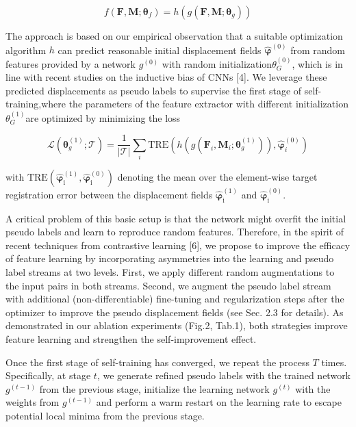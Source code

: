 \begin{equation}\tag*{(1)}
  f(\boldsymbol{F},\boldsymbol{M};\boldsymbol{\theta}_f)=h(g(\boldsymbol{F},\boldsymbol{M};\boldsymbol{\theta}_g))
\end{equation}

The approach is based on our empirical observation that a suitable optimization algorithm $h$ can predict reasonable initial displacement fields $\hat{\boldsymbol{\varphi}}^{(0)}$ from random features provided by a network $g^{(0)}$ with random initialization$\theta_G^{(0)} $, which is in line with recent studies on the inductive bias of CNNs [4]. We leverage these predicted displacements as pseudo labels to supervise the first stage of self-training,where the parameters of the feature extractor with different initialization$\theta_G^{(1)} $are optimized by minimizing the loss

\begin{equation}\tag*{(2)}
  \mathcal{L}(\boldsymbol{\theta}_g^{(1)};\mathcal{T})=\frac{1}{|\mathcal{T}|}\sum_i\mathrm{TRE}\left(h\left(g\left(\boldsymbol{F}_i,\boldsymbol{M}_i;\boldsymbol{\theta}_g^{(1)}\right)\right),\hat{\boldsymbol{\varphi}}_i^{(0)}\right)
\end{equation}

with $\mathrm{TRE}(\hat{\boldsymbol{\varphi}}_\mathrm{i}^{(1)},\hat{\boldsymbol{\varphi}}_\mathrm{i}^{(0)})$ denoting the mean over the element-wise target registration error between the displacement fields $\hat{\boldsymbol{\varphi}}_\mathrm{i}^{(1)} $ and $\hat{\boldsymbol{\varphi}}_\mathrm{i}^{(0)}$.

A critical problem of this basic setup is that the network might overfit the initial pseudo labels and learn to reproduce random features. Therefore, in the spirit of recent techniques from contrastive learning [6], we propose to improve the efficacy of feature learning by incorporating asymmetries into the learning and pseudo label streams at two levels. First, we apply different random augmentations to the input pairs in both streams. Second, we augment the pseudo label stream with additional (non-differentiable) fine-tuning and regularization steps after the optimizer to improve the pseudo displacement fields (see Sec. 2.3 for details). As demonstrated in our ablation experiments (Fig.2, Tab.1), both strategies improve feature learning and strengthen the self-improvement effect.

Once the first stage of self-training has converged, we repeat the process $T$ times. Specifically, at stage $t$, we generate refined pseudo labels with the trained network $g^{(t-1)}$ from the previous stage, initialize the learning network $g^{(t)}$ with the weights from $g^{(t-1)}$ and perform a warm restart on the learning rate to escape potential local minima from the previous stage.

